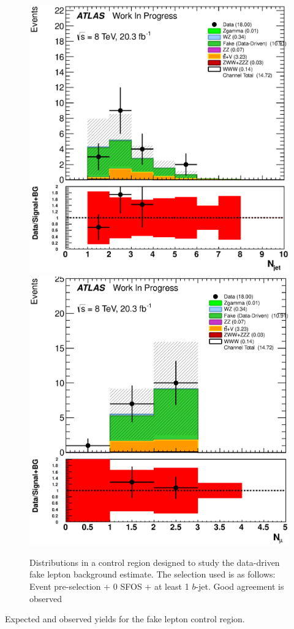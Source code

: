 \begin{figure}[ht!]
\includegraphics[width=0.3\columnwidth]{figures/Fake_CR/NJets_histratio.eps}
\includegraphics[width=0.3\columnwidth]{figures/Fake_CR/NMuons_histratio.eps}
\caption{Distributions in a control region designed to study the data-driven fake lepton background estimate.  The selection used is as follows: Event pre-selection + 0 SFOS + at least 1 $b$-jet.  Good agreement is observed}
\label{fig:FakeCR}
\end{figure}

\begin{table}[ht!]
\centering

\caption{Expected and observed yields for the fake lepton control region.}
\label{tab:FakeCR}
\end{table}


